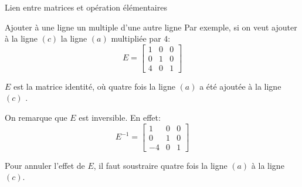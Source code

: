 \documentclass[a4paper]{article}
\begin{document}
\begin{parag}{Lien entre matrices et opération élémentaires}
    \begin{subparag}{Ajouter à une ligne un multiple d'une autre ligne}
        Par exemple, si on veut ajouter à la ligne $\left(c\right)$ la ligne $\left(a\right)$ multipliée par $4$:
        \[E = \begin{bmatrix} 1 & 0 & 0 \\ 0 & 1 & 0 \\ 4 & 0 & 1 \end{bmatrix} \]

        $E$ est la matrice identité, où quatre fois la ligne $\left(a\right)$ a été ajoutée à la ligne $\left(c\right)$ .

        On remarque que $E$ est inversible. En effet:
        \[E^{-1} = \begin{bmatrix} 1 & 0 & 0 \\ 0 & 1 & 0 \\ -4 & 0 & 1 \end{bmatrix} \]

        Pour annuler l'effet de $E$, il faut soustraire quatre fois la ligne $\left(a\right)$ à la ligne $\left(c\right)$.
    \end{subparag}
\end{parag}
\end{document}
